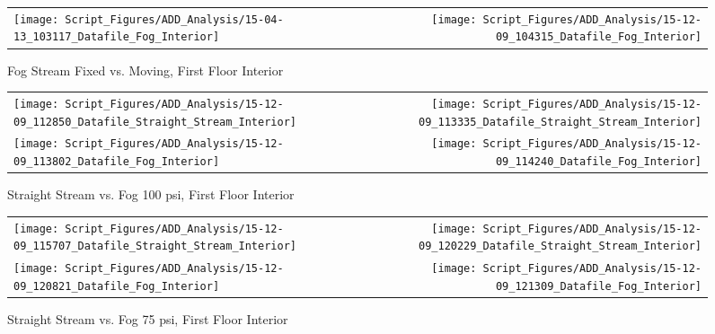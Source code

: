 \documentclass{article}
\begin{document}
\begin{appendices}
\begin{figure}[ht]
\begin{tabular*}{\textwidth}{lr}
\texttt{[image: Script\_Figures/ADD\_Analysis/15-04-13\_103117\_Datafile\_Fog\_Interior]} &
\texttt{[image: Script\_Figures/ADD\_Analysis/15-12-09\_104315\_Datafile\_Fog\_Interior]} \\
\end{tabular*}
\caption{Fog Stream Fixed vs. Moving, First Floor Interior}
\label{fig:Fog Stream Fixed vs. Moving, First Floor Interior}
\end{figure}

\clearpage

\begin{figure}[ht]
\begin{tabular*}{\textwidth}{lr}
\texttt{[image: Script\_Figures/ADD\_Analysis/15-12-09\_112850\_Datafile\_Straight\_Stream\_Interior]} &
\texttt{[image: Script\_Figures/ADD\_Analysis/15-12-09\_113335\_Datafile\_Straight\_Stream\_Interior]} \\
\texttt{[image: Script\_Figures/ADD\_Analysis/15-12-09\_113802\_Datafile\_Fog\_Interior]} &
\texttt{[image: Script\_Figures/ADD\_Analysis/15-12-09\_114240\_Datafile\_Fog\_Interior]} \\
\end{tabular*}
\caption{Straight Stream vs. Fog 100 psi, First Floor Interior}
\label{fig:Straight Stream vs. Fog 100 psi, First Floor Interior}
\end{figure}

\clearpage

\begin{figure}[ht]
\begin{tabular*}{\textwidth}{lr}
\texttt{[image: Script\_Figures/ADD\_Analysis/15-12-09\_115707\_Datafile\_Straight\_Stream\_Interior]} &
\texttt{[image: Script\_Figures/ADD\_Analysis/15-12-09\_120229\_Datafile\_Straight\_Stream\_Interior]} \\
\texttt{[image: Script\_Figures/ADD\_Analysis/15-12-09\_120821\_Datafile\_Fog\_Interior]} &
\texttt{[image: Script\_Figures/ADD\_Analysis/15-12-09\_121309\_Datafile\_Fog\_Interior]} \\
\end{tabular*}
\caption{Straight Stream vs. Fog 75 psi, First Floor Interior}
\label{fig:Straight Stream vs. Fog 75 psi, First Floor Interior}
\end{figure}

\clearpage


\end{appendices}
\end{document}
